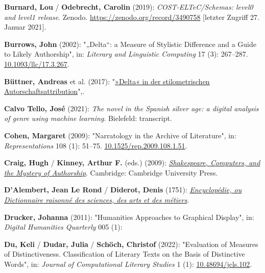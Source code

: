 \documentclass[
  12pt,
  letterpaper,
  DIV=11,
  numbers=noendperiod]{scrreprt}
\newlength{\cslhangindent}
\newenvironment{CSLReferences}[2] %
 {\begin{list}{}{%
  \setlength{\itemindent}{0pt}
  \setlength{\leftmargin}{0pt}
  \setlength{\parsep}{0pt}
  \ifodd #1
   \setlength{\leftmargin}{\cslhangindent}
   \setlength{\itemindent}{-1\cslhangindent}
  \fi
  \setlength{\itemsep}{#2\baselineskip}}}
 {\end{list}}
\begin{document}
\begin{CSLReferences}{1}{0}
\textbf{Burnard, Lou} / \textbf{Odebrecht, Carolin} (2019):
\emph{{COST}-{ELTeC}/{Schemas}: level0 and level1 release}. Zenodo.
\url{https://zenodo.org/record/3490758} {[}letzter Zugriff 27. Januar
2021{]}.

\textbf{Burrows, John} (2002): "{„{Delta}``}: a {Measure} of {Stylistic}
{Difference} and a {Guide} to {Likely} {Authorship}", in: \emph{Literary
and Linguistic Computing} 17 (3): 267--287.
\href{https://doi.org/10.1093/llc/17.3.267}{10.1093/llc/17.3.267}.

\textbf{Büttner, Andreas} et al. (2017):
"\href{http://dx.doi.org/10.17175/2017_006}{»{Delta}« in der
stilometrischen {Autorschaftsattribution}}",.

\textbf{Calvo Tello, José} (2021): \emph{The novel in the {Spanish}
silver age: a digital analysis of genre using machine learning}.
Bielefeld: transcript.

\textbf{Cohen, Margaret} (2009): "Narratology in the {Archive} of
{Literature}", in: \emph{Representations} 108 (1): 51--75.
\href{https://doi.org/10.1525/rep.2009.108.1.51}{10.1525/rep.2009.108.1.51}.

\textbf{Craig, Hugh} / \textbf{Kinney, Arthur F.} (eds.) (2009):
\emph{\href{https://doi.org/10.1017/CBO9780511605437}{Shakespeare,
{Computers}, and the {Mystery} of {Authorship}}}. Cambridge: Cambridge
University Press.

\textbf{D'Alembert, Jean Le Rond} / \textbf{Diderot, Denis} (1751):
\emph{\href{https://fr.wikisource.org/wiki/Encyclop\%C3\%A9die,_ou_Dictionnaire_raisonn\%C3\%A9_des_sciences,_des_arts_et_des_m\%C3\%A9tiers}{Encyclopédie,
ou {Dictionnaire} raisonné des sciences, des arts et des métiers}}.

\textbf{Drucker, Johanna} (2011): "Humanities {Approaches} to
{Graphical} {Display}", in: \emph{Digital Humanities Quarterly} 005 (1):

\textbf{Du, Keli} / \textbf{Dudar, Julia} / \textbf{Schöch, Christof}
(2022): "Evaluation of {Measures} of {Distinctiveness}. {Classification}
of {Literary} {Texts} on the {Basis} of {Distinctive} {Words}", in:
\emph{Journal of Computational Literary Studies} 1 (1):
\href{https://doi.org/10.48694/jcls.102}{10.48694/jcls.102}.


\end{CSLReferences}
\end{document}
